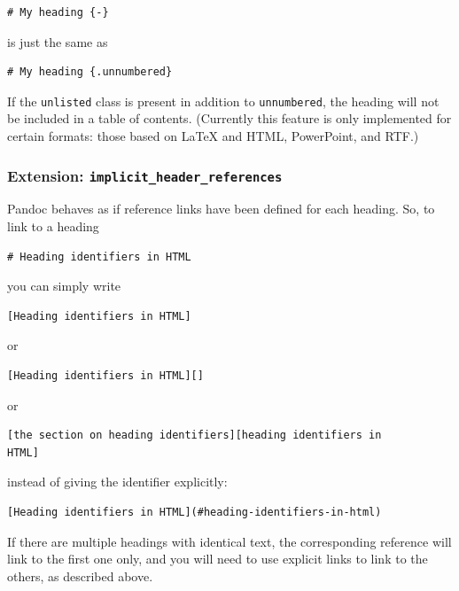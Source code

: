 \documentclass[
]{article}
\begin{document}
\begin{verbatim}
# My heading {-}
\end{verbatim}

is just the same as

\begin{verbatim}
# My heading {.unnumbered}
\end{verbatim}

If the \texttt{unlisted} class is present in addition to
\texttt{unnumbered}, the heading will not be included in a table of
contents. (Currently this feature is only implemented for certain
formats: those based on LaTeX and HTML, PowerPoint, and RTF.)

\hypertarget{extension-implicit_header_references}{%
\subsubsection{\texorpdfstring{Extension:
\texttt{implicit\_header\_references}}{Extension: implicit\_header\_references}}\label{extension-implicit_header_references}}

Pandoc behaves as if reference links have been defined for each heading.
So, to link to a heading

\begin{verbatim}
# Heading identifiers in HTML
\end{verbatim}

you can simply write

\begin{verbatim}
[Heading identifiers in HTML]
\end{verbatim}

or

\begin{verbatim}
[Heading identifiers in HTML][]
\end{verbatim}

or

\begin{verbatim}
[the section on heading identifiers][heading identifiers in
HTML]
\end{verbatim}

instead of giving the identifier explicitly:

\begin{verbatim}
[Heading identifiers in HTML](#heading-identifiers-in-html)
\end{verbatim}

If there are multiple headings with identical text, the corresponding
reference will link to the first one only, and you will need to use
explicit links to link to the others, as described above.
\end{document}
